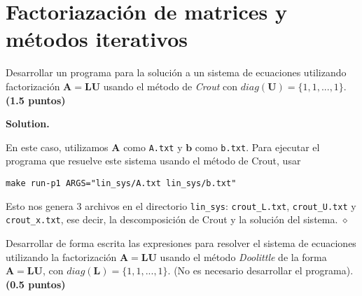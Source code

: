 \documentclass{article}
\theoremstyle{problemstyle}
\newenvironment{solution}{%
  \begin{mdframed}[linewidth=0.8pt,linecolor=Gray,backgroundcolor=Gray!5,roundcorner=5pt]%
  \noindent\textbf{Solution.}%
}{%
\hfill $ \diamond $ 
  \end{mdframed}%
}
\begin{document}
\section*{Factoriazaci\'on de matrices y m\'etodos iterativos}\label{sec:factoriazaci_on_de_matrices_y_m_etodos_iterativos} %


\begin{problem}
Desarrollar un programa para la soluci\'on a un sistema de ecuaciones
utilizando factorizaci\'on $ \mathbf{A} = \mathbf{LU} $ usando el método de
\textit{Crout} con $diag(\mathbf{U}) = \{1, 1, . . . , 1\}$. \textbf{(1.5
	puntos)}
\end{problem}

\begin{solution}
	En este caso, utilizamos $ \mathbf{A} $ como \texttt{A.txt} y $ \mathbf{b} $ como \texttt{b.txt}. Para ejecutar el programa que resuelve este sistema usando el m\'etodo de Crout, usar

	\begin{center}
		\texttt{make run-p1 ARGS="lin\_sys/A.txt lin\_sys/b.txt"}
	\end{center}
	Esto nos genera 3 archivos en el directorio \texttt{lin\_sys}: \texttt{crout\_L.txt}, \texttt{crout\_U.txt} y \texttt{crout\_x.txt}, ese decir, la descomposici\'on de Crout y la soluci\'on del sistema.
\end{solution}

\begin{problem}
Desarrollar de forma escrita las expresiones para resolver el sistema de
ecuaciones utilizando la factorizaci\'on $ \mathbf{A} = \mathbf{LU} $ usando el
m\'etodo \textit{Doolittle} de la forma $ \mathbf{A} = \mathbf{LU} $, con
$diag(\mathbf{L}) = \{1, 1, . . . , 1\}$. (No es necesario desarrollar el
programa).\textbf{(0.5 puntos)}
\end{problem}
\end{document}
